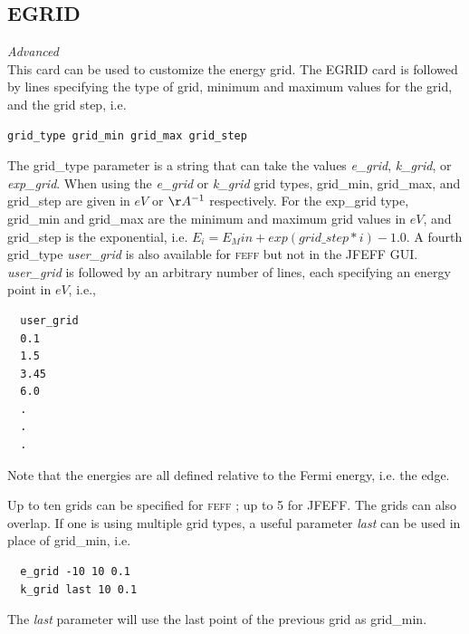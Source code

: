 \documentclass[11pt,oneside]{report} %
\newcommand{\program}[1]{\textsc{#1}}
\newcommand{\feff}{\program{feff}}
\newenvironment{Card}[4]%
      {\vspace{3ex}%
        \subsection{#1}
        \quad\textsl{#3}\newline
        \quad\texttt{#2}\newline%
        \label{card:#4}\\}
      {}
\begin{document}
\begin{Card}{EGRID}{}{Advanced}{egr}
This card can be used to customize the energy grid. The EGRID card is followed
by lines specifying the type of grid, minimum and maximum values for
the grid, and the grid step, i.e.
\begin{verbatim}
grid_type grid_min grid_max grid_step
\end{verbatim}
The grid\_type parameter is a string that can take the values
\textit{e\_grid}, \textit{k\_grid}, or \textit{exp\_grid}.
When using the \textit{e\_grid} or \textit{k\_grid} grid types,
grid\_min, grid\_max, and grid\_step are given in $eV$ or $\AA^{-1}$
respectively. For the exp\_grid type, grid\_min and grid\_max are the
minimum and maximum grid values in $eV$, and grid\_step is the
exponential, i.e.
$E_{i} = E_Min + exp(grid\_step*i) - 1.0$.
A fourth grid\_type \textit{user\_grid} is also
available for {\feff} but not in the JFEFF GUI. \textit{user\_grid} is followed by an arbitrary number of
lines, each specifying an energy point in $eV$, i.e.,
\begin{verbatim}
  user_grid
  0.1
  1.5
  3.45
  6.0
  .
  .
  .
\end{verbatim}
Note that the energies are all defined relative to the Fermi energy,
i.e. the edge. 

Up to ten grids can be specified for {\feff} ; up to 5 for JFEFF. The grids can also overlap. If one
is using multiple grid types, a useful parameter \textit{last} can be
used in place of grid\_min, i.e.
\begin{verbatim}
  e_grid -10 10 0.1
  k_grid last 10 0.1
\end{verbatim}
The \textit{last} parameter will use the last point of the previous
grid as grid\_min.
\end{Card}
\end{document}
